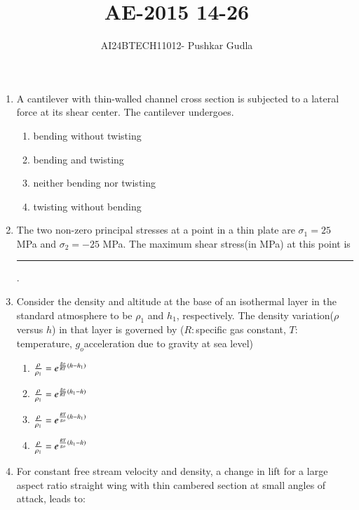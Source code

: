 \documentclass[journal,12pt,onecolumn]{IEEEtran}
\theoremstyle{remark}
\begin{document}

\vspace{3cm}

\title{\textbf{AE-2015 14-26}}
\author{AI24BTECH11012- Pushkar Gudla}
\maketitle
\bigskip

\renewcommand{\thefigure}{\theenumi}
\renewcommand{\thetable}{\theenumi}
\setlength{\columnsep}{2.5em}

\begin{enumerate}
    \item A cantilever with thin-walled channel cross section is subjected to a lateral force at its shear center. The cantilever undergoes.
    \begin{enumerate}
    \item bending without twisting
    \item bending and twisting
    \item neither bending nor twisting
    \item twisting without bending
    \end{enumerate}
  \item The two non-zero principal stresses at a point in a thin plate are $\sigma_1=25$ MPa and $\sigma_2=-25$ MPa. The maximum shear stress(in MPa) at this point is \rule{2.5cm}{0.4pt}.
  \item Consider the density and altitude at the base of an isothermal layer in the standard atmosphere to be $\rho_1$ and $h_1$, respectively. The density variation($\rho$ versus $h$) in that layer is governed by ($R:$specific gas constant, $T:$temperature, $g_o$acceleration due to gravity at sea level)
    \begin{enumerate}
    \item $\frac{\rho}{\rho_1}=e^{\frac{g_o}{RT}\left(h-h_1\right)}$
    \item $\frac{\rho}{\rho_1}=e^{\frac{g_o}{RT}\left(h_1-h\right)}$
    \item $\frac{\rho}{\rho_1}=e^{\frac{RT}{g_o}\left(h-h_1\right)}$
    \item $\frac{\rho}{\rho_1}=e^{\frac{RT}{g_o}\left(h_1-h\right)}$
    \end{enumerate}
  \item For constant free stream velocity and density, a change in lift for a large aspect ratio straight wing with thin cambered section at small angles of attack, leads to:
  \begin{enumerate}

\end{enumerate}
\end{enumerate}
\end{document}
